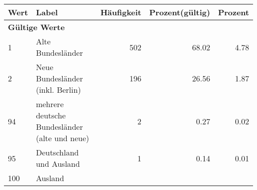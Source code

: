      \begin{longtable}{lXrrr}
     \toprule
     \textbf{Wert} & \textbf{Label} & \textbf{Häufigkeit} & \textbf{Prozent(gültig)} & \textbf{Prozent} \\
     \endhead
     \midrule
     \multicolumn{5}{l}{\textbf{Gültige Werte}}\\

     1 &
     \multicolumn{1}{X}{ Alte Bundesländer   } &


       \num{502} &
       \num[round-mode=places,round-precision=2]{68,02} &
         \num[round-mode=places,round-precision=2]{4,78} \\

     2 &
     \multicolumn{1}{X}{ Neue Bundesländer (inkl. Berlin)   } &


       \num{196} &
       \num[round-mode=places,round-precision=2]{26,56} &
         \num[round-mode=places,round-precision=2]{1,87} \\

     94 &
     \multicolumn{1}{X}{ mehrere deutsche Bundesländer (alte und neue)   } &


       \num{2} &
       \num[round-mode=places,round-precision=2]{0,27} &
         \num[round-mode=places,round-precision=2]{0,02} \\

     95 &
     \multicolumn{1}{X}{ Deutschland und Ausland   } &


       \num{1} &
       \num[round-mode=places,round-precision=2]{0,14} &
         \num[round-mode=places,round-precision=2]{0,01} \\

     100 &
     \multicolumn{1}{X}{ Ausland   } &



\end{longtable}
